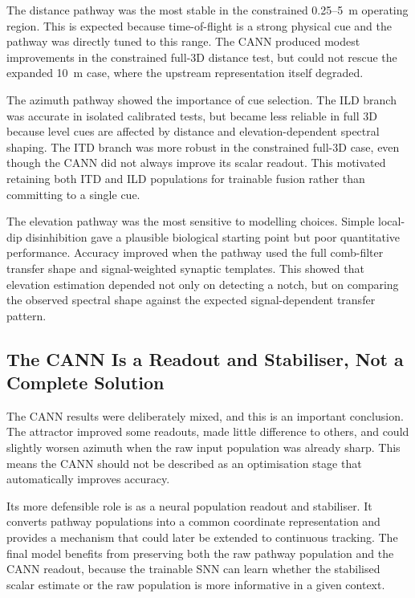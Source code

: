 The distance pathway was the most stable in the constrained 0.25--5~m operating region. This is expected because time-of-flight is a strong physical cue and the pathway was directly tuned to this range. The CANN produced modest improvements in the constrained full-3D distance test, but could not rescue the expanded 10~m case, where the upstream representation itself degraded.

The azimuth pathway showed the importance of cue selection. The ILD branch was accurate in isolated calibrated tests, but became less reliable in full 3D because level cues are affected by distance and elevation-dependent spectral shaping. The ITD branch was more robust in the constrained full-3D case, even though the CANN did not always improve its scalar readout. This motivated retaining both ITD and ILD populations for trainable fusion rather than committing to a single cue.

The elevation pathway was the most sensitive to modelling choices. Simple local-dip disinhibition gave a plausible biological starting point but poor quantitative performance. Accuracy improved when the pathway used the full comb-filter transfer shape and signal-weighted synaptic templates. This showed that elevation estimation depended not only on detecting a notch, but on comparing the observed spectral shape against the expected signal-dependent transfer pattern.

\subsection{The CANN Is a Readout and Stabiliser, Not a Complete Solution}

The CANN results were deliberately mixed, and this is an important conclusion. The attractor improved some readouts, made little difference to others, and could slightly worsen azimuth when the raw input population was already sharp. This means the CANN should not be described as an optimisation stage that automatically improves accuracy.

Its more defensible role is as a neural population readout and stabiliser. It converts pathway populations into a common coordinate representation and provides a mechanism that could later be extended to continuous tracking. The final model benefits from preserving both the raw pathway population and the CANN readout, because the trainable SNN can learn whether the stabilised scalar estimate or the raw population is more informative in a given context.

